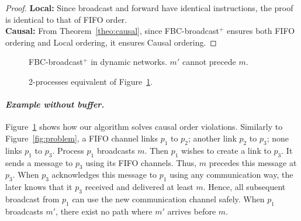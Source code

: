 \begin{proof}
  \textbf{Local:} Since broadcast and forward have identical instructions, the
  proof is identical to that of FIFO order. \\
  \textbf{Causal:} From Theorem~\ref{theo:causal}, since FBC-broadcast$^+$
  ensures both FIFO ordering and Local ordering, it ensures Causal ordering.
\end{proof}

\begin{figure}
  \begin{center}
    
    \caption{\label{fig:solved}FBC-broadcast$^+$ in dynamic networks. $m'$
      cannot precede $m$.}
  \end{center}
\end{figure}

\begin{figure}
  \begin{center}
    
    \caption{\label{fig:eq2solved}2-processes equivalent of Figure~\ref{fig:solved}.}
  \end{center}
\end{figure}

\paragraph{\emph{Example without buffer.}} Figure~\ref{fig:solved} shows how our
algorithm solves causal order violations. Similarly to Figure~\ref{fig:problem},
a FIFO channel links $p_1$ to $p_2$; another link $p_2$ to $p_3$; none links
$p_1$ to $p_3$. Process $p_1$ broadcasts $m$. Then $p_1$ wishes to create a link
to $p_3$. It sends a message to $p_3$ using its FIFO channels. Thus, $m$
precedes this message at $p_3$. When $p_3$ acknowledges this message to $p_1$
using any communication way, the later knows that it $p_3$ received and
delivered at least $m$. Hence, all subsequent broadcast from $p_1$ can use the
new communication channel safely. When $p_1$ broadcasts $m'$, there exist no
path where $m'$ arrives before $m$.

